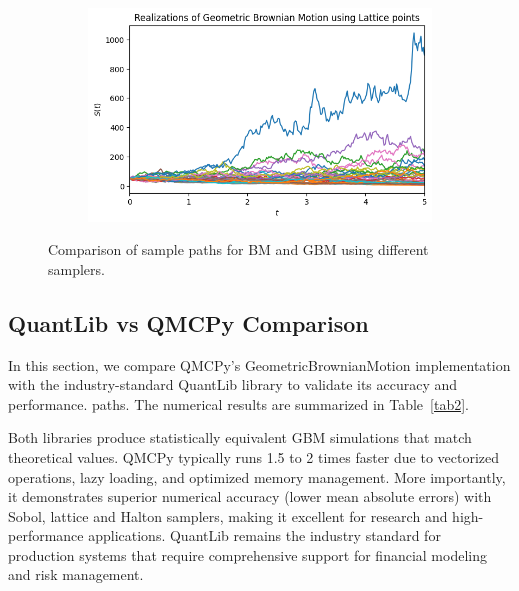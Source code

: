 \begin{figure}[H]
\begin{subfigure}[b]{0.49\textwidth}
\caption{}
\label{fig:bm_lattice}
\end{subfigure}
\hfill
\begin{subfigure}[b]{0.49\textwidth}
\includegraphics[width=\textwidth]{GBM/images/figure_4.png}
\caption{}
\label{fig:gbm_lattice}
\end{subfigure}
\caption{Comparison of sample paths for BM and GBM using different samplers.}
\label{fig:bm_gbm_paths}
\end{figure}

\subsection{QuantLib vs QMCPy Comparison}

In this section, we compare QMCPy's GeometricBrownianMotion implementation with
the industry-standard QuantLib library \cite{quantlib} to validate its accuracy
and performance. %
paths.
The numerical results are summarized in Table~\ref{tab2}. 

Both libraries produce statistically equivalent GBM simulations that match
theoretical values. QMCPy typically runs 1.5 to 2 times faster due to vectorized
operations, lazy loading, and optimized memory management. More importantly, it
demonstrates superior numerical accuracy (lower mean absolute errors) with
Sobol, lattice and Halton samplers, making it excellent for research and
high-performance applications. QuantLib remains the industry standard for
production systems that require comprehensive support for financial modeling and
risk management.



